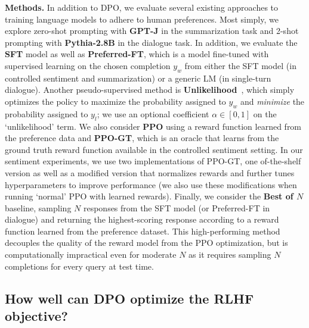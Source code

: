 \textbf{Methods.} In addition to DPO, we evaluate several existing approaches to training language models to adhere to human preferences. Most simply, we explore zero-shot prompting with \textbf{GPT-J} \citep{gpt-j} in the summarization task and 2-shot prompting with \textbf{Pythia-2.8B} \citep{biderman2023pythia} in the dialogue task. In addition, we evaluate the \textbf{SFT} model as well as \textbf{Preferred-FT}, which is a model fine-tuned with supervised learning on the chosen completion $y_w$ from either the SFT model (in controlled sentiment and summarization) or a generic LM (in single-turn dialogue). Another pseudo-supervised method is \textbf{Unlikelihood}~\citep{welleck2019neural}, which simply optimizes the policy to maximize the probability assigned to $y_w$ and \textit{minimize} the probability assigned to $y_l$; we use an optional coefficient $\alpha\in[0,1]$ on the `unlikelihood' term. We also consider \textbf{PPO} \citep{schulman2017proximal} using a reward function learned from the preference data and \textbf{PPO-GT}, which is an oracle that learns from the ground truth reward function available in the controlled sentiment setting. In our sentiment experiments, we use two implementations of PPO-GT, one of-the-shelf version \cite{leandro_von_werra_2023_7790115} as well as a modified version that normalizes rewards and further tunes hyperparameters to improve performance (we also use these modifications when running `normal' PPO with learned rewards). Finally, we consider the \textbf{Best of $N$} baseline, sampling $N$ responses from the SFT model (or Preferred-FT in dialogue) and returning the highest-scoring response according to a reward function learned from the preference dataset. This high-performing method decouples the quality of the reward model from the PPO optimization, but is computationally impractical even for moderate $N$ as it requires sampling $N$ completions for every query at test time.

\subsection{How well can DPO optimize the RLHF objective?}



